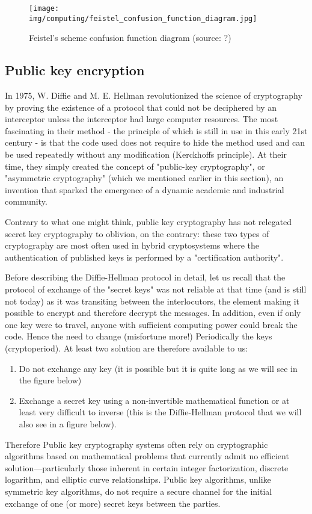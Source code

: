 	\begin{figure}[H]
		\centering
		\texttt{[image: img/computing/feistel\_confusion\_function\_diagram.jpg]}
		\caption{Feistel's scheme confusion function diagram (source: ?)}
	\end{figure}
	
	\pagebreak
	\subsection{Public key encryption}
	In 1975, W. Diffie and M. E. Hellman revolutionized the science of cryptography by proving the existence of a protocol that could not be deciphered by an interceptor unless the interceptor had large computer resources. The most fascinating in their method - the principle of which is still in use in this early 21st century - is that the code used does not require to hide the method used and can be used repeatedly without any modification (Kerckhoffs principle). At their time, they simply created the concept of "public-key cryptography", or "asymmetric cryptography" (which we mentioned earlier in this section), an invention that sparked the emergence of a dynamic academic and industrial community.
	\begin{tcolorbox}[title=Remark,colframe=black,arc=10pt]
	Contrary to what one might think, public key cryptography has not relegated secret key cryptography to oblivion, on the contrary: these two types of cryptography are most often used in hybrid cryptosystems where the authentication of published keys is performed by a "certification authority".
	\end{tcolorbox}
	Before describing the Diffie-Hellman protocol  in detail, let us recall that the protocol of exchange of the "secret keys" was not reliable at that time (and is still not today) as it was transiting between the interlocutors, the element making it possible to encrypt and therefore decrypt the messages. In addition, even if only one key were to travel, anyone with sufficient computing power could break the code. Hence the need to change (misfortune more!) Periodically the keys (cryptoperiod). At least two solution are therefore available to us:
	\begin{enumerate}
		\item Do not exchange any key (it is possible but it is quite long as we will see in the figure below)

		\item Exchange a secret key using a non-invertible mathematical function or at least very difficult to inverse (this is the Diffie-Hellman protocol that we will also see in a figure below).
	\end{enumerate}
	Therefore Public key cryptography systems often rely on cryptographic algorithms based on mathematical problems that currently admit no efficient solution—particularly those inherent in certain integer factorization, discrete logarithm, and elliptic curve relationships. Public key algorithms, unlike symmetric key algorithms, do not require a secure channel for the initial exchange of one (or more) secret keys between the parties.

